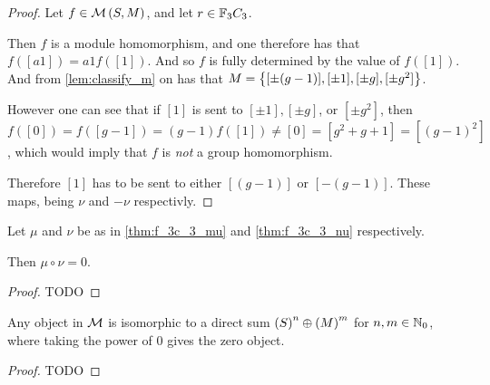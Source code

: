 \begin{proof}
    Let \( f \in {\mathcal{M}}\left( S, M \right) \), and let \( r \in {\mathbb{F}}_3C_3 \).
    
    Then \( f \) is a module homomorphism, and one therefore has that \( f([a1]) = a1 f([1]) \). And so \( f \) is fully determined by the value of \( f([1]) \). And from \autoref{lem:classify_m} on has that \( M = \left\{ [\pm (g - 1)], [\pm 1], [\pm g], [\pm g^2] \right\} \).

    However one can see that if \( [1] \) is sent to \( [\pm 1], [\pm g] \), or \( [\pm g^2] \), then \( f([0]) = f([g - 1]) = (g - 1)f([1]) \neq [0] = [g^2 + g + 1] = [(g - 1)^2] \), which would imply that \( f \) is \emph{not} a group homomorphism.

    Therefore \( [1] \) has to be sent to either \( [(g - 1)] \) or \( [-(g - 1)] \). These maps, being \( \nu \) and \( -\nu \) respectivly.
\end{proof}

\begin{lemma} \label{thm:f_3c_3_mu_circ_nu_zero}
    Let \( \mu \) and \( \nu \) be as in \autoref{thm:f_3c_3_mu} and \autoref{thm:f_3c_3_nu} respectively.

    Then \( \mu \circ \nu = 0 \).
\end{lemma}
\begin{proof}
    TODO
\end{proof}

\begin{lemma} \label{thm:f_3c_3_decomposition}
    Any object in \( {\mathcal{M}} \) is isomorphic to a direct sum \( \left(  S  \right)^n \oplus \left(  M  \right)^m \) for \( n, m \in {\mathbb{N}}_0 \), where taking the power of \( 0 \) gives the zero object. \sloppy
\end{lemma}
\begin{proof}
    TODO
\end{proof}

